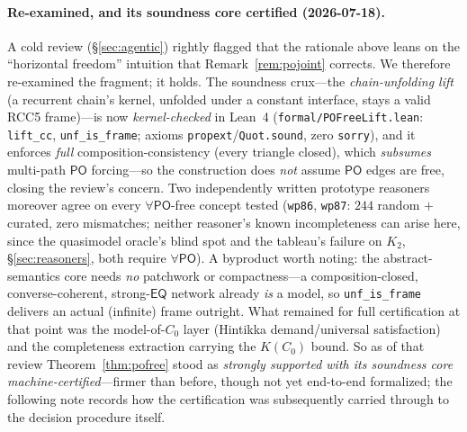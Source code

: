 \documentclass[11pt]{article}
\newcommand{\PO}{\mathsf{PO}}
\newcommand{\EQ}{\mathsf{EQ}}
\newcommand{\code}[1]{\texttt{#1}}
\theoremstyle{plain}
\theoremstyle{definition}
\begin{document}
\paragraph{Re-examined, and its soundness core certified (2026-07-18).} A
cold review (\S\ref{sec:agentic}) rightly flagged that the rationale above
leans on the ``horizontal freedom'' intuition that
Remark~\ref{rem:pojoint} corrects. We therefore re-examined the fragment; it
holds. The soundness crux---the \emph{chain-unfolding lift} (a recurrent
chain's kernel, unfolded under a constant interface, stays a valid RCC5
frame)---is now \emph{kernel-checked} in Lean~4
(\texttt{formal/POFreeLift.lean}: \code{lift\_cc}, \code{unf\_is\_frame};
axioms \texttt{propext}/\texttt{Quot.sound}, zero \code{sorry}), and it
enforces \emph{full} composition-consistency (every triangle closed), which
\emph{subsumes} multi-path $\PO$ forcing---so the construction does \emph{not}
assume $\PO$ edges are free, closing the review's concern. Two independently
written prototype reasoners moreover agree on every $\forall\PO$-free concept
tested (\texttt{wp86}, \texttt{wp87}: $244$ random $+$ curated, zero
mismatches; neither reasoner's known incompleteness can arise here, since the
quasimodel oracle's blind spot and the tableau's failure on $K_2$,
\S\ref{sec:reasoners}, both require $\forall\PO$). A byproduct worth noting: the abstract-semantics core needs \emph{no}
patchwork or compactness---a composition-closed, converse-coherent,
strong-$\EQ$ network already \emph{is} a model, so \code{unf\_is\_frame}
delivers an actual (infinite) frame outright. What remained for full
certification at that point was the model-of-$C_0$ layer (Hintikka
demand/universal satisfaction) and the completeness extraction carrying the
$K(C_0)$ bound. So as of that review Theorem~\ref{thm:pofree} stood as
\emph{strongly supported with its soundness core machine-certified}---firmer
than before, though not yet end-to-end formalized; the following note records
how the certification was subsequently carried through to the decision
procedure itself.
\end{document}
